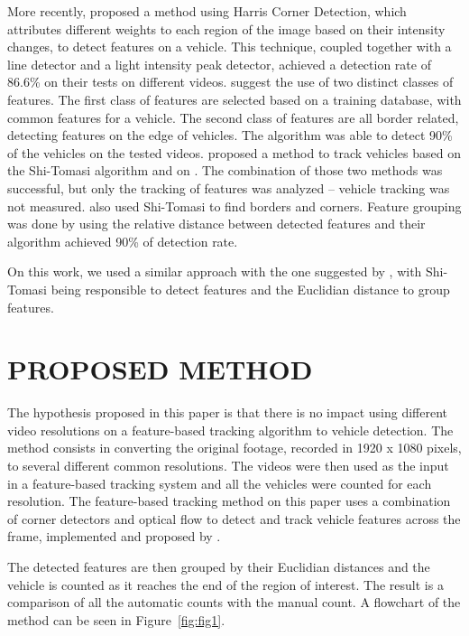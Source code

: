 \documentclass[article,12pt,a4paper,oneside,hidelinks]{memoir}
\begin{document}
More recently, \citet{jazayeri2011vehicle} proposed a method using Harris Corner Detection, which attributes different weights to each region of the image based on their intensity changes, to detect features on a vehicle. This technique, coupled together with a line detector and a light intensity peak detector, achieved a detection rate of 86.6\% on their tests on different videos. \citet{lin2012integrating} suggest the use of two distinct classes of features. The first class of features are selected based on a training database, with common features for a vehicle. The second class of features are all border related, detecting features on the edge of vehicles. The algorithm was able to detect 90\% of the vehicles on the tested videos. \citet{do2016multi} proposed a method to track vehicles based on the Shi-Tomasi algorithm \citep{shi1993good} and on \citep{lowe2004distinctive}. The combination of those two methods was successful, but only the tracking of features was analyzed – vehicle tracking was not measured. \citet{shih2017automated} also used Shi-Tomasi to find borders and corners. Feature grouping was done by using the relative distance between detected features and their algorithm achieved 90\% of detection rate.

On this work, we used a similar approach with the one suggested by \citet{shih2017automated}, with Shi-Tomasi being responsible to detect features and the Euclidian distance to group features.

\section{PROPOSED METHOD}
The hypothesis proposed in this paper is that there is no impact using different video resolutions on a feature-based tracking algorithm to vehicle detection. The method consists in converting the original footage, recorded in 1920 x 1080 pixels, to several different common resolutions. The videos were then used as the input in a feature-based tracking system and all the vehicles were counted for each resolution. The feature-based tracking method on this paper uses a combination of corner detectors \citep{shi1993good} and optical flow \citep{lucas1981iterative} to detect and track vehicle features across the frame, implemented and proposed by \citet{marcomini2018}.

The detected features are then grouped by their Euclidian distances and the vehicle is counted as it reaches the end of the region of interest.  The result is a comparison of all the automatic counts with the manual count. A flowchart of the method can be seen in Figure~\ref{fig:fig1}.
\end{document}
